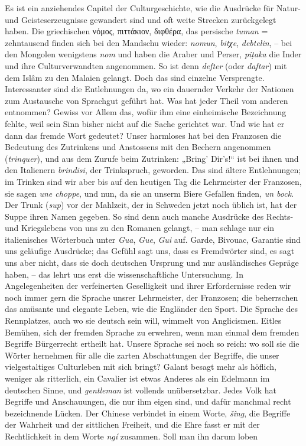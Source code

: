 {Es ist ein anziehendes Capitel der Culturgeschichte, wie die Ausdrücke für Natur- und Geisteserzeugnisse gewandert sind und oft weite Strecken zurückgelegt haben. Die griechischen νόμος, πιττάκιον, διφθέρα, das persische \textit{tuman} = zehntausend finden sich bei den Mandschu wieder: \textit{nomun}, \textit{bitχe}, \textit{debtelin},  – bei den Mongolen wenigstens \textit{nom} und  haben die Araber und Perser, \textit{piṭaka} die Inder und ihre Culturverwandten angenommen. So ist denn \textit{defter} (oder \textit{daftar}) mit dem Islâm zu den Malaien gelangt. Doch das sind einzelne Versprengte. Interessanter sind die Entlehnungen da, wo ein dauernder Verkehr der Nationen zum Austausche von Sprachgut geführt hat. Was hat jeder Theil vom anderen entnommen? Gewiss vor Allem das, wofür ihm eine einheimische Bezeichnung fehlte, weil sein Sinn bisher nicht auf die Sache gerichtet war. Und wie hat er dann das fremde Wort gedeutet? Unser harmloses  hat bei den Franzosen die Bedeutung des Zutrinkens und Anstossens mit den Bechern angenommen (\textit{trinquer}), und aus dem Zurufe beim Zutrinken: „Bring’ Dir’s!“ ist bei ihnen und den Italienern \textit{brindisi}, der Trinkspruch, geworden. Das sind ältere Entlehnungen; im Trinken sind wir aber bis auf den heutigen Tag die Lehrmeister der Franzosen, sie sagen \textit{une choppe}, und nun, da sie an unserm Biere Gefallen finden, \textit{un bock}. Der Trunk (\textit{sup}) vor der Mahlzeit, der in Schweden jetzt noch üblich ist, hat der Suppe ihren Namen gegeben. So sind denn auch manche Ausdrücke des Rechts- und Kriegslebens von uns zu \label{fp.260} den Romanen gelangt, – man schlage nur ein italienisches Wörterbuch unter \textit{Gua}, \textit{Gue}, \textit{Gui} auf. Garde, Bivouac, Garantie sind uns geläufige Ausdrücke; das Gefühl sagt uns, dass es Fremdwörter sind, es sagt uns aber nicht, dass sie doch deutschen Ursprung und nur ausländisches Gepräge haben, – das lehrt uns erst die wissenschaftliche Untersuchung. In Angelegenheiten der verfeinerten Geselligkeit und ihrer Erfordernisse reden wir noch immer gern die Sprache unsrer Lehrmeister, der Franzosen; die beherrschen das amüsante und elegante Leben, wie die Engländer den Sport. Die Sprache des Rennplatzes, auch wo sie deutsch sein will, wimmelt von Anglicismen. Eitles Bemühen, sich der fremden Sprache zu erwehren, wenn man einmal dem fremden Begriffe Bürgerrecht ertheilt hat. Unsere Sprache sei noch so reich: wo soll sie die Wörter hernehmen für alle die zarten Abschattungen der Begriffe, die unser vielgestaltiges Culturleben mit sich bringt? Galant besagt mehr als höflich, weniger als ritterlich, ein Cavalier ist etwas Anderes als ein Edelmann im deutschen \label{sp.265} Sinne, und \textit{gentleman} ist vollends unübersetzbar. Jedes Volk hat Begriffe und Anschauungen, die nur ihm eigen sind, und dafür manchmal recht bezeichnende Lücken. Der Chinese verbindet in einem Worte, \textit{šîng}, die Begriffe der Wahrheit und der sittlichen Freiheit, und die Ehre fasst er mit der Rechtlichkeit in dem Worte \textit{ngí} zusammen. Soll man ihn darum loben }
